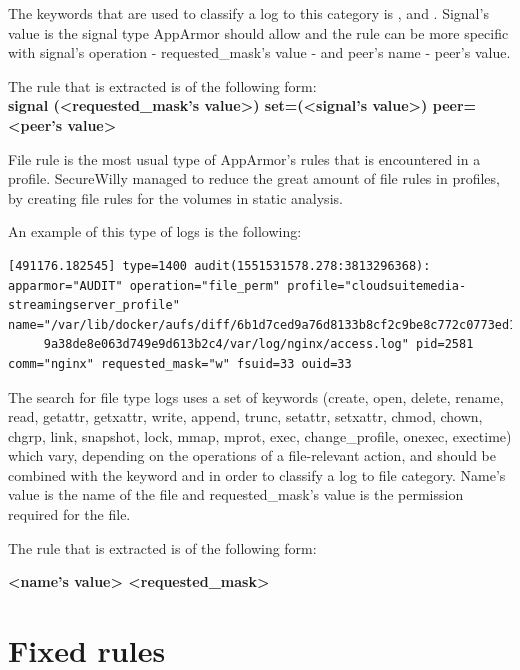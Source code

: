 \begin{description}[style=nextline]
The keywords that are used to classify a log to this category is ,  and . Signal's value is the signal type AppArmor should allow and the rule can be more specific with signal's operation - requested\_mask's value - and peer's name  - peer's value.

The rule that is extracted is of the following form:\\\textbf{signal (\textless requested\_mask's value\textgreater) set=(\textless signal's value\textgreater) peer=\textless peer's value\textgreater}

\item[File rules]

File rule is the most usual type of AppArmor's rules that is encountered in a profile. SecureWilly managed to reduce the great amount of file rules in profiles, by creating file rules for the volumes in static analysis. 

An example of this type of logs is the following:

\begin{lstlisting}[style=dockercommands]
[491176.182545] type=1400 audit(1551531578.278:3813296368): apparmor="AUDIT" operation="file_perm" profile="cloudsuitemedia-streamingserver_profile" name="/var/lib/docker/aufs/diff/6b1d7ced9a76d8133b8cf2c9be8c772c0773ed1
	 9a38de8e063d749e9d613b2c4/var/log/nginx/access.log" pid=2581 comm="nginx" requested_mask="w" fsuid=33 ouid=33
\end{lstlisting}

The search for file type logs uses a set of keywords (create, open, delete, rename, read, getattr, getxattr, write, append, trunc, setattr, setxattr, chmod, chown, chgrp, link, snapshot, lock, mmap, mprot, exec, change\_profile, onexec, exectime) which vary, depending on the operations of a file-relevant action, and should be combined with the keyword  and  in order to classify a log to file category. Name's value is the name of the file and requested\_mask's value is the permission required for the file.

The rule that is extracted is of the following form:

\textbf{\textless name's value\textgreater{} \textless requested\_mask\textgreater}

\end{description}

\section{Fixed rules}

